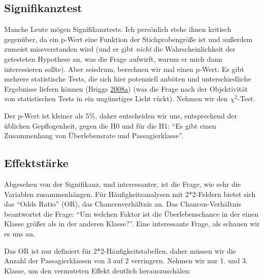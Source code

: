 \documentclass[12pt,ngerman,]{book}
\makeatletter
\newenvironment{Shaded}{\begin{snugshade}}{\end{snugshade}}
\newcommand{\KeywordTok}[1]{\textcolor[rgb]{0.13,0.29,0.53}{\textbf{#1}}}
\newcommand{\CommentTok}[1]{\textcolor[rgb]{0.56,0.35,0.01}{\textit{#1}}}
\newcommand{\OperatorTok}[1]{\textcolor[rgb]{0.81,0.36,0.00}{\textbf{#1}}}
\newcommand{\NormalTok}[1]{#1}
\newenvironment{kframe}{%
\medskip{}
\setlength{\fboxsep}{.8em}
 \def\at@end@of@kframe{}%
 \ifinner\ifhmode%
  \def\at@end@of@kframe{\end{minipage}}%
  \begin{minipage}{\columnwidth}%
 \fi\fi%
 \def\FrameCommand##1{\hskip\@totalleftmargin \hskip-\fboxsep
 \colorbox{shadecolor}{##1}\hskip-\fboxsep
     \hskip-\linewidth \hskip-\@totalleftmargin \hskip\columnwidth}%
 \MakeFramed {\advance\hsize-\width
   \@totalleftmargin\z@ \linewidth\hsize
   \@setminipage}}%
 {\par\unskip\endMakeFramed%
 \at@end@of@kframe}
\renewenvironment{Shaded}{\begin{kframe}}{\end{kframe}}
\theoremstyle{definition}
\theoremstyle{definition}
\theoremstyle{remark}
\makeatother
\begin{document}
\subsection{Signifikanztest}\label{signifikanztest}

Manche Leute mögen Signifikanztests. Ich persönlich stehe ihnen kritisch
gegenüber, da ein p-Wert eine Funktion der Stichprobengröße ist und
außerdem zumeist missverstanden wird (und er gibt \emph{nicht} die
Wahrscheinlichkeit der getesteten Hypothese an, was die Frage aufwirft,
warum er mich dann interessieren sollte). Aber seisdrum, berechnen wir
mal einen p-Wert. Es gibt mehrere statistische Tests, die sich hier
potenziell anböten und unterschiedliche Ergebnisse liefern können
(Briggs
\protect\hyperlink{ref-breaking}{2008}\protect\hyperlink{ref-breaking}{a})
(was die Frage nach der Objektivität von statistischen Tests in ein
ungünstiges Licht rückt). Nehmen wir den \(\chi^2\)-Test.

\begin{Shaded}
\end{Shaded}

Der p-Wert ist kleiner als 5\%, daher entscheiden wir uns, entsprechend
der üblichen Gepflogenheit, gegen die H0 und für die H1: ``Es gibt einen
Zusammenhang von Überlebensrate und Passagierklasse''.

\subsection{Effektstärke}\label{effektstarke-1}

Abgesehen von der Signifikanz, und interessanter, ist die Frage, wie
sehr die Variablen zusammenhängen. Für Häufigkeitsanalysen mit
2*2-Feldern bietet sich das ``Odds Ratio'' (OR), das Chancenverhältnis
an. Das Chancen-Verhältnis beantwortet die Frage: ``Um welchen Faktor
ist die Überlebenschance in der einen Klasse größer als in der anderen
Klasse?''. Eine interessante Frage, als schauen wir es uns an.

Das OR ist nur definiert für 2*2-Häufigkeitstabellen, daher müssen wir
die Anzahl der Passagierklassen von 3 auf 2 verringern. Nehmen wir nur
1. und 3. Klasse, um den vermuteten Effekt deutlich herauszuschälen:
\end{document}
